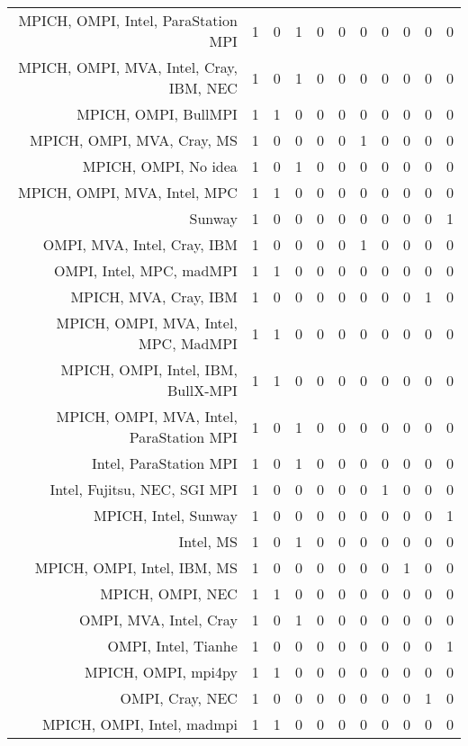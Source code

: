 {\begin{landscape}
\begin{longtable}[htb]{r|c|c|c|c|c|c|c|c|c|c}
{MPICH, OMPI, Intel, ParaStation MPI} & 1 & 0 & 1 & 0 & 0 & 0 & 0 & 0 & 0 & 0 \\%
{MPICH, OMPI, MVA, Intel, Cray, IBM, NEC} & 1 & 0 & 1 & 0 & 0 & 0 & 0 & 0 & 0 & 0 \\%
{MPICH, OMPI, BullMPI} & 1 & 1 & 0 & 0 & 0 & 0 & 0 & 0 & 0 & 0 \\%
{MPICH, OMPI, MVA, Cray, MS} & 1 & 0 & 0 & 0 & 0 & 1 & 0 & 0 & 0 & 0 \\%
{MPICH, OMPI, No idea} & 1 & 0 & 1 & 0 & 0 & 0 & 0 & 0 & 0 & 0 \\%
{MPICH, OMPI, MVA, Intel, MPC} & 1 & 1 & 0 & 0 & 0 & 0 & 0 & 0 & 0 & 0 \\%
{Sunway} & 1 & 0 & 0 & 0 & 0 & 0 & 0 & 0 & 0 & 1 \\%
{OMPI, MVA, Intel, Cray, IBM} & 1 & 0 & 0 & 0 & 0 & 1 & 0 & 0 & 0 & 0 \\%
{OMPI, Intel, MPC, madMPI} & 1 & 1 & 0 & 0 & 0 & 0 & 0 & 0 & 0 & 0 \\%
{MPICH, MVA, Cray, IBM} & 1 & 0 & 0 & 0 & 0 & 0 & 0 & 0 & 1 & 0 \\%
{MPICH, OMPI, MVA, Intel, MPC, MadMPI} & 1 & 1 & 0 & 0 & 0 & 0 & 0 & 0 & 0 & 0 \\%
{MPICH, OMPI, Intel, IBM, BullX-MPI} & 1 & 1 & 0 & 0 & 0 & 0 & 0 & 0 & 0 & 0 \\%
{MPICH, OMPI, MVA, Intel, ParaStation MPI} & 1 & 0 & 1 & 0 & 0 & 0 & 0 & 0 & 0 & 0 \\%
{Intel, ParaStation MPI} & 1 & 0 & 1 & 0 & 0 & 0 & 0 & 0 & 0 & 0 \\%
{Intel, Fujitsu, NEC, SGI MPI} & 1 & 0 & 0 & 0 & 0 & 0 & 1 & 0 & 0 & 0 \\%
{MPICH, Intel, Sunway} & 1 & 0 & 0 & 0 & 0 & 0 & 0 & 0 & 0 & 1 \\%
{Intel, MS} & 1 & 0 & 1 & 0 & 0 & 0 & 0 & 0 & 0 & 0 \\%
{MPICH, OMPI, Intel, IBM, MS} & 1 & 0 & 0 & 0 & 0 & 0 & 0 & 1 & 0 & 0 \\%
{MPICH, OMPI, NEC} & 1 & 1 & 0 & 0 & 0 & 0 & 0 & 0 & 0 & 0 \\%
{OMPI, MVA, Intel, Cray} & 1 & 0 & 1 & 0 & 0 & 0 & 0 & 0 & 0 & 0 \\%
{OMPI, Intel, Tianhe} & 1 & 0 & 0 & 0 & 0 & 0 & 0 & 0 & 0 & 1 \\%
{MPICH, OMPI, mpi4py} & 1 & 1 & 0 & 0 & 0 & 0 & 0 & 0 & 0 & 0 \\%
{OMPI, Cray, NEC} & 1 & 0 & 0 & 0 & 0 & 0 & 0 & 0 & 1 & 0 \\%
{MPICH, OMPI, Intel, madmpi} & 1 & 1 & 0 & 0 & 0 & 0 & 0 & 0 & 0 & 0 \\%

\end{longtable}
\end{landscape}}
